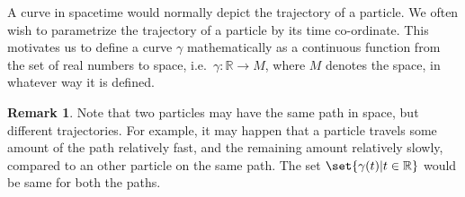 \documentclass[a4 paper, oneside, 12pt]{book}
\theoremstyle{definition}
\newtheorem{remark}{Remark}
\newcommand{\rr}{\mathbb{R}}
\begin{document}
	A curve in spacetime would normally depict the trajectory of a particle. We often wish to parametrize the trajectory of a particle by its time co-ordinate. This motivates us to define a curve \(\gamma\) mathematically as a continuous function from the set of real numbers to space, i.e.\ \(\gamma \colon \rr \rightarrow M\), where \(M\) denotes the space, in whatever way it is defined.

	\begin{remark}
		Note that two particles may have the same path in space, but different trajectories. For example, it may happen that a particle travels some amount of the path relatively fast, and the remaining amount relatively slowly, compared to an other particle on the same path.  The set \(\set{\gamma (t) | t \in \rr}\) would be same for both the paths.
	\end{remark}

	\nocite{*}
	\printbibliography[heading=bibintoc]
	\printindex
\end{document}
